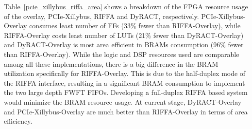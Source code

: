 Table~\ref{pcie_xillybus_riffa_area} shows a breakdown of the FPGA resource usage of the overlay, PCIe-Xillybus, RIFFA and DyRACT, respectively. 
PCIe-Xillybus-Overlay consumes least number of FFs (33\% fewer than RIFFA-Overlay), while RIFFA-Overlay costs least number of LUTs (21\% fewer than DyRACT-Overlay) and DyRACT-Overlay is most area efficient in BRAMs consumption (96\% fewer than RIFFA-Overlay). 
While the logic and DSP resources used are comparable among all these implementations, there is a big difference in the BRAM utilization specifically for RIFFA-Overlay.
This is due to the half-duplex mode of the RIFFA interface, resulting in a significant BRAM consumption to implement the two large depth FWFT FIFOs. 
Developing a full-duplex RIFFA based system would minimize the BRAM resource usage. 
At current stage, DyRACT-Overlay and PCIe-Xillybus-Overlay are much better than RIFFA-Overlay in terms of area efficiency. 
 
\begin{table}[tb]
	\caption{Area overhead of PCIe-based systems.}
	\label{pcie_xillybus_riffa_area}
	\centering
\end{table}
